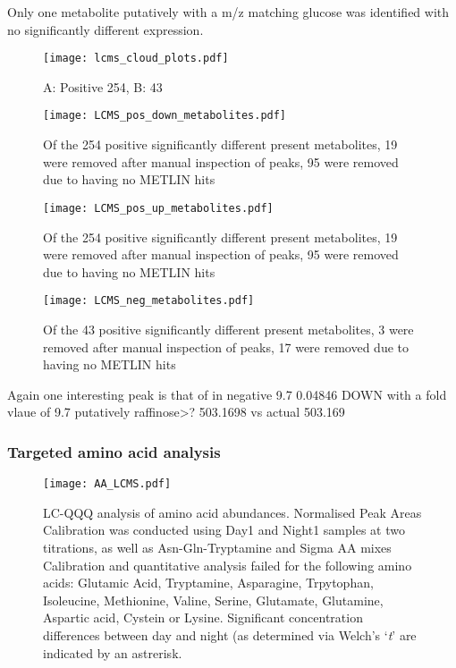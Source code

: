 Only one metabolite putatively with a m/z matching glucose 
was identified with no significantly different expression.



\begin{figure}
    \centering
    \texttt{[image: lcms\_cloud\_plots.pdf]}
    \caption[LCQTOF Cloud Plots]{A: Positive 254,  B: 43}
    \label{fig:lcms_clouds}
\end{figure}


\begin{figure}
    \centering
    \texttt{[image: LCMS\_pos\_down\_metabolites.pdf]}
    \caption{Of the 254 positive significantly different present metabolites,
        19 were removed after manual inspection of peaks, 95 were removed due
    to having no METLIN hits}
    \label{fig:posqtofdown}
\end{figure}


\begin{figure}
    \centering
    \texttt{[image: LCMS\_pos\_up\_metabolites.pdf]}
    \caption{Of the 254 positive significantly different present metabolites,
        19 were removed after manual inspection of peaks, 95 were removed due
    to having no METLIN hits}
    \label{fig:posqtofup}
\end{figure}


\begin{figure}
    \centering
    \texttt{[image: LCMS\_neg\_metabolites.pdf]}
    \caption{Of the 43 positive significantly different present metabolites,
        3 were removed after manual inspection of peaks, 17 were removed due
    to having no METLIN hits}
    \label{fig:poslcqtof}
\end{figure}




Again one interesting peak is that of 
in negative
9.7 0.04846 DOWN with a fold vlaue of 9.7
putatively raffinose>? 503.1698  vs actual 503.169
    

\subsubsection{Targeted amino acid analysis}



\begin{figure}
    \texttt{[image: AA\_LCMS.pdf]}
    \caption[LCQQQ Quantitative Analysis of Amino Acids]{LC-QQQ analysis
        of amino acid abundances. Normalised Peak Areas 
        Calibration was conducted using Day1 and Night1 samples at two titrations, as well as Asn-Gln-Tryptamine and Sigma AA mixes
    Calibration and quantitative analysis failed for the following amino acids: 
Glutamic Acid, Tryptamine, Asparagine, Trpytophan, Isoleucine, Methionine, Valine, Serine, Glutamate, Glutamine, Aspartic acid, Cystein or Lysine.
Significant concentration differences between day and night (as determined via Welch's `\textit{t}' are indicated by an astrerisk.}
    \label{fig:amino_acids}
\end{figure}









